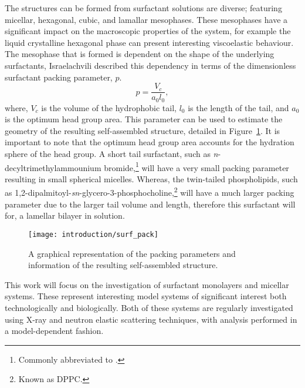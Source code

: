 The structures can be formed from surfactant solutions are diverse; featuring micellar, hexagonal, cubic, and lamallar mesophases.
These mesophases have a significant impact on the macroscopic properties of the system, for example the liquid crystalline hexagonal phase can present interesting viscoelastic behaviour.\autocite{jurasin_lamellar_2013,cordobes_linear_1997}
The mesophase that is formed is dependent on the shape of the underlying surfactants, Israelachvili described this dependency in terms of the dimensionless surfactant packing parameter, $p$.\autocite{israelachvili_intermolecular_2011}
%
\begin{equation}
p = \frac{V_c}{a_0l_0},
\end{equation}
%
where, $V_c$ is the volume of the hydrophobic tail, $l_0$ is the length of the tail, and $a_0$ is the optimum head group area.
This parameter can be used to estimate the geometry of the resulting self-assembled structure, detailed in Figure~\ref{fig:pack}.
It is important to note that the optimum head group area accounts for the hydration sphere of the head group.
A short tail surfactant, such as \emph{n}-decyltrimethylammounium bromide,\footnote{Commonly abbreviated to .} will have a very small packing parameter resulting in small spherical micelles.
Whereas, the twin-tailed phospholipids, such as 1,2-dipalmitoyl-\emph{sn}-glycero-3-phosphocholine,\footnote{Known as DPPC.} will have a much larger packing parameter due to the larger tail volume and length, therefore this surfactant will for, a lamellar bilayer in solution.
%
\begin{figure}
    \centering
    \texttt{[image: introduction/surf\_pack]}
    \caption{A graphical representation of the packing parameters and information of the resulting self-assembled structure.}
    \label{fig:pack}
\end{figure}
%

This work will focus on the investigation of surfactant monolayers and micellar systems.
These represent interesting model systems of significant interest both technologically\autocite{anton_reverse_2010,zagnoni_miniaturised_2012} and biologically.\autocite{kataoka_block_2012,mohwald_phospholipid_1990,kewalramani_effects_2010}
Both of these systems are regularly investigated using X-ray and neutron elastic scattering techniques, with analysis performed in a model-dependent fashion.\autocite{pambou_structural_2015,hayward_liquid_2015,rodriguez-loureiro_neutron_2017,hazell_langmuir_2016}
